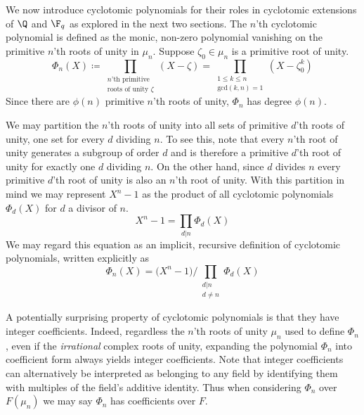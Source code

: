 We now introduce cyclotomic polynomials for their roles in cyclotomic extensions of $\Q$ and $\F_q$ as explored in the next two sections.
The $n$'th cyclotomic polynomial is defined as the monic, non-zero polynomial vanishing on the primitive $n$'th roots of unity in $\mu_n$.
Suppose $\zeta_0\in\mu_n$ is a primitive root of unity.
\begin{equation}
    \Phi_n(X)\coloneqq\prod_{\substack{
        \text{$n$'th primitive}\\
        \text{roots of unity $\zeta$}
    }} (X - \zeta)
    = \prod_{\substack{1\leq k\leq n\\\text{gcd}(k,n)=1}} (X-\zeta_0^k)
\end{equation}
Since there are $\phi(n)$ primitive $n$'th roots of unity, $\Phi_n$ has degree $\phi(n)$.

We may partition the $n$'th roots of unity into all sets of primitive $d$'th roots of unity, one set for every $d$ dividing $n$.
To see this, note that every $n$'th root of unity generates a subgroup of order $d$ and is therefore a primitive $d$'th root of unity for exactly one $d$ dividing $n$.
On the other hand, since $d$ divides $n$ every primitive $d$'th root of unity is also an $n$'th root of unity.
With this partition in mind we may represent $X^n-1$ as the product of all cyclotomic polynomials $\Phi_d(X)$ for $d$ a divisor of $n$.
\begin{equation}
    X^n - 1 = \prod_{d|n} \Phi_d(X)
\end{equation}
We may regard this equation as an implicit, recursive definition of cyclotomic polynomials, written explicitly as
\begin{equation}
    \Phi_n(X) = \big(X^n - 1\big) \Bigg/ \prod_{\substack{d|n\\d\neq n}} \Phi_d(X)
\end{equation}

A potentially surprising property of cyclotomic polynomials is that they have integer coefficients.
Indeed, regardless the $n$'th roots of unity $\mu_n$ used to define $\Phi_n$, even if the \emph{irrational} complex roots of unity, expanding the polynomial $\Phi_n$ into coefficient form always yields integer coefficients.
Note that integer coefficients can alternatively be interpreted as belonging to any field by identifying them with multiples of the field's additive identity.
Thus when considering $\Phi_n$ over $F(\mu_n)$ we may say $\Phi_n$ has coefficients over $F$.


